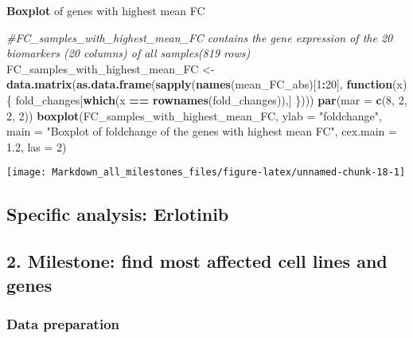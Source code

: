 \documentclass[]{article}
\newenvironment{Shaded}{\begin{snugshade}}{\end{snugshade}}
\newcommand{\CommentTok}[1]{\textcolor[rgb]{0.56,0.35,0.01}{\textit{#1}}}
\newcommand{\ControlFlowTok}[1]{\textcolor[rgb]{0.13,0.29,0.53}{\textbf{#1}}}
\newcommand{\DataTypeTok}[1]{\textcolor[rgb]{0.13,0.29,0.53}{#1}}
\newcommand{\DecValTok}[1]{\textcolor[rgb]{0.00,0.00,0.81}{#1}}
\newcommand{\FloatTok}[1]{\textcolor[rgb]{0.00,0.00,0.81}{#1}}
\newcommand{\KeywordTok}[1]{\textcolor[rgb]{0.13,0.29,0.53}{\textbf{#1}}}
\newcommand{\NormalTok}[1]{#1}
\newcommand{\OperatorTok}[1]{\textcolor[rgb]{0.81,0.36,0.00}{\textbf{#1}}}
\newcommand{\StringTok}[1]{\textcolor[rgb]{0.31,0.60,0.02}{#1}}
\begin{document}
\textbf{Boxplot} of genes with highest mean FC

\begin{Shaded}
\begin{Highlighting}[]
\CommentTok{#FC_samples_with_highest_mean_FC contains the gene expression of the 20 biomarkers (20 columns) of all samples(819 rows) }
\NormalTok{FC_samples_with_highest_mean_FC <-}\StringTok{ }\KeywordTok{data.matrix}\NormalTok{(}\KeywordTok{as.data.frame}\NormalTok{(}\KeywordTok{sapply}\NormalTok{(}\KeywordTok{names}\NormalTok{(mean_FC_abs)[}\DecValTok{1}\OperatorTok{:}\DecValTok{20}\NormalTok{], }\ControlFlowTok{function}\NormalTok{(x)\{}
\NormalTok{  fold_changes[}\KeywordTok{which}\NormalTok{(x }\OperatorTok{==}\StringTok{ }\KeywordTok{rownames}\NormalTok{(fold_changes)),]}
\NormalTok{\})))}
\KeywordTok{par}\NormalTok{(}\DataTypeTok{mar =} \KeywordTok{c}\NormalTok{(}\DecValTok{8}\NormalTok{, }\DecValTok{2}\NormalTok{, }\DecValTok{2}\NormalTok{, }\DecValTok{2}\NormalTok{))}
\KeywordTok{boxplot}\NormalTok{(FC_samples_with_highest_mean_FC, }
      \DataTypeTok{ylab =} \StringTok{"foldchange"}\NormalTok{, }
      \DataTypeTok{main =} \StringTok{"Boxplot of foldchange of the genes with highest mean FC"}\NormalTok{, }
      \DataTypeTok{cex.main =} \FloatTok{1.2}\NormalTok{,}
      \DataTypeTok{las =} \DecValTok{2}\NormalTok{) }
\end{Highlighting}
\end{Shaded}

\begin{center}\texttt{[image: Markdown\_all\_milestones\_files/figure-latex/unnamed-chunk-18-1]} \end{center}

\hypertarget{specific-analysis-erlotinib}{%
\subsection{\texorpdfstring{\textbf{Specific analysis: Erlotinib
}}{Specific analysis: Erlotinib }}\label{specific-analysis-erlotinib}}

\hypertarget{milestone-find-most-affected-cell-lines-and-genes}{%
\subsection{2. Milestone: find most affected cell lines and
genes}\label{milestone-find-most-affected-cell-lines-and-genes}}

\hypertarget{data-preparation}{%
\subsubsection{Data preparation}\label{data-preparation}}
\end{document}
